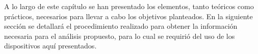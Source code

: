 A lo largo de este capítulo se han presentado los elementos, tanto teóricos como prácticos, necesarios para llevar a cabo los objetivos planteados.
En la siguiente sección se detallará el procedimiento realizado para obtener la información necesaria para el análisis propuesto, para lo cual se requirió del uso de los dispositivos aquí presentados.

